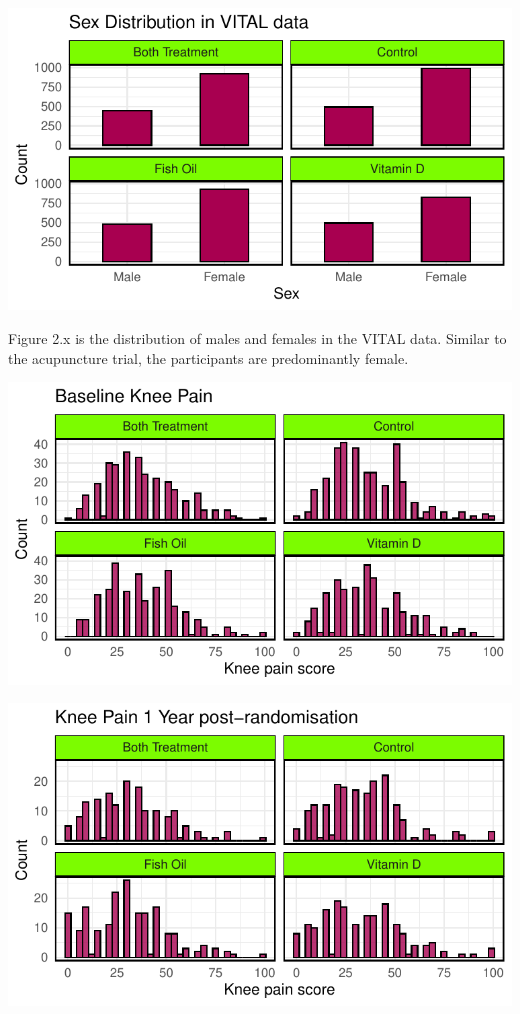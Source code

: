\documentclass{article}
\begin{document}
\begin{center}\includegraphics{Final_Report_files/figure-latex/unnamed-chunk-13-1} \end{center}

Figure 2.x is the distribution of males and females in the VITAL data.
Similar to the acupuncture trial, the participants are predominantly
female.

\begin{center}\includegraphics{Final_Report_files/figure-latex/unnamed-chunk-14-1} \end{center}

\begin{center}\includegraphics{Final_Report_files/figure-latex/unnamed-chunk-15-1} \end{center}
\end{document}
